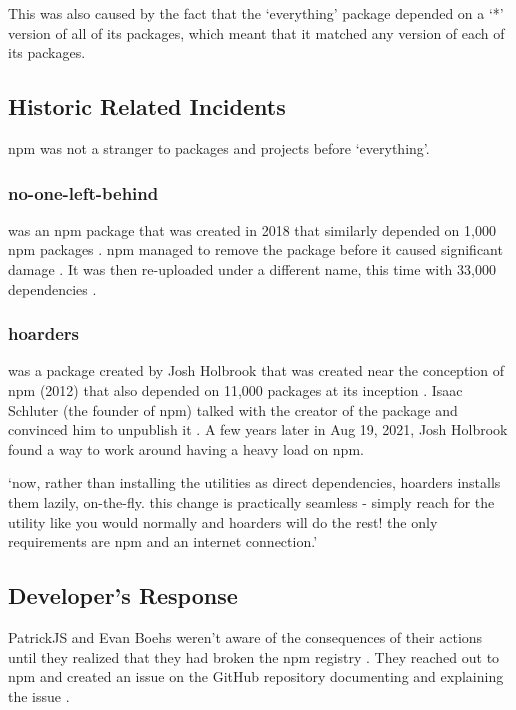 \documentclass[acmsmall]{acmart}
\begin{document}
This was also caused by the fact that the `everything' package depended on a `*' version
of all of its packages, which meant that it matched any version of each of its packages.

\subsection{Historic Related Incidents}
npm was not a stranger to packages and projects before `everything'.

\subsubsection{no-one-left-behind}
was an npm package that was created in 2018 that similarly depended
on 1,000 npm packages \cite{npm-no-one-left-behind-dependencies}. npm managed to remove
the package before it caused significant damage \cite{npm-no-one-left-behind-security}.
It was then re-uploaded under a different name, this time with 33,000 dependencies \cite{socket-everything}.

\subsubsection{hoarders}
was a package created by Josh Holbrook that was created near the conception of npm (2012) that
also depended on 11,000 packages at its inception \cite{github-hoarders-dependencies}.
Isaac Schluter (the founder of npm) talked with the creator of the package and convinced
him to unpublish it \cite{github-hoarders}.  A few years later in Aug 19, 2021, Josh Holbrook
found a way to work around having a heavy load on npm.

`now, rather than installing the utilities as direct dependencies, hoarders
installs them lazily, on-the-fly. this change is practically seamless - simply
reach for the utility like you would normally and hoarders will do the rest! the
only requirements are npm and an internet connection.' \cite{github-hoarders}

\subsection{Developer's Response}
PatrickJS and Evan Boehs weren't aware of the consequences of their actions
until they realized that they had broken the npm registry
\cite{youtube-everything}. They reached out to npm and created an issue on the
GitHub repository documenting and explaining the issue
\cite{bleepingcomputer-everything}.
\end{document}
